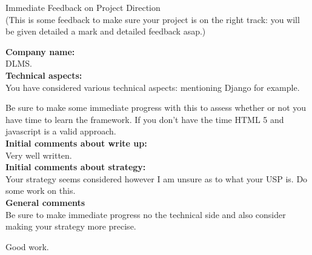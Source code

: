 \documentclass{article}
\begin{document}
\begin{center}
\Huge{Immediate Feedback on Project Direction}\\
\tiny{(This is some feedback to make sure your project is on the right track: you will be given detailed a mark and detailed feedback asap.)}
\end{center}


\normalsize
\textbf{Company name:}\\

DLMS. \\

\textbf{Technical aspects:}\\

You have considered various technical aspects: mentioning Django for example.

Be sure to make some immediate progress with this to assess whether or not you have time to learn the framework.
If you don't have the time HTML 5 and javascript is a valid approach.\\

\textbf{Initial comments about write up:}\\

Very well written.\\

\textbf{Initial comments about strategy:}\\

Your strategy seems considered however I am unsure as to what your USP is.
Do some work on this.\\

\textbf{General comments}\\

Be sure to make immediate progress no the technical side and also consider making your strategy more precise.

Good work.
\end{document}
